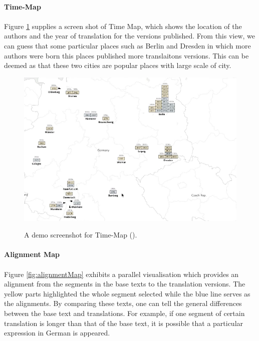 \paragraph{Time-Map}
\paragraph[]{} 

Figure \ref{fig:timeMap} supplies a screen shot of Time Map, which shows the location of the authors and the year of translation for the versions published.  From this view, we can guess that some particular places such as Berlin and Dresden in which more authors were born this places published more translaitons versions. This can be deemed as that these two cities are popular places with large scale of city.

\begin{figure}[H] 
	\centering    
	\includegraphics[scale=0.7]{Figs/Time-Map}\\[1ex]
	\caption{A demo screenshot for Time-Map (\cite{Cheesman2012}).}
	\label{fig:timeMap}
\end{figure} 

\paragraph{Alignment Map}
\paragraph[]{}

Figure \ref{fig:alignmentMap} exhibits a parallel visualisation which provides an alignment from the segments in the base texts to the translation versions. The yellow parts highlighted the whole segment selected while the blue line serves as the alignments. By comparing these texts, one can tell the general differences between the base text and translations. For example, if one segment of certain translation is longer than that of the base text, it is possible that a particular expression in German is appeared. 

